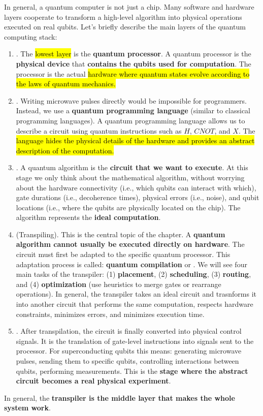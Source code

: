 \highspace
In general, a quantum computer is not just a chip. Many software and hardware layers cooperate to transform a high-level algorithm into physical operations executed on real qubits. Let's briefly describe the main layers of the quantum computing stack:
\begin{enumerate}
    \item {}. The \hl{lowest layer} is the \textbf{quantum processor}. A quantum processor is the \textbf{physical device} that \textbf{contains the qubits used for computation}. The processor is the actual \hl{hardware where quantum states evolve according to the laws of quantum mechanics.}
    \item {}. Writing microwave pulses directly would be impossible for programmers. Instead, we use a \textbf{quantum programming language} (similar to classical programming languages). A quantum programming language allows us to describe a circuit using quantum instructions such as $H$, $CNOT$, and $X$. The \hl{language hides the physical details of the hardware and provides an abstract description of the computation.}
    \item {}. A quantum algorithm is the \textbf{circuit that we want to execute}. At this stage we only think about the mathematical algorithm, without worrying about the hardware connectivity (i.e., which qubits can interact with which), gate durations (i.e., decoherence times), physical errors (i.e., noise), and qubit locations (i.e., where the qubits are physically located on the chip). The algorithm represents the \textbf{ideal computation}.
    \item {} (Transpiling). This is the central topic of the chapter. A \textbf{quantum algorithm cannot usually be executed directly on hardware}. The circuit must first be adapted to the specific quantum processor. This adaptation process is called: \textbf{quantum compilation} or . We will see four main tasks of the transpiler: (1) \textbf{placement}, (2) \textbf{scheduling}, (3) \textbf{routing}, and (4) \textbf{optimization} (use heuristics to merge gates or rearrange operations). In general, the transpiler takes an ideal circuit and trasnforms it into another circuit that performs the same computation, respects hardware constraints, minimizes errors, and minimizes execution time.
    \item {}. After transpilation, the circuit is finally converted into physical control signals. It is the translation of gate-level instructions into signals sent to the processor. For superconducting qubits this means: generating microwave pulses, sending them to specific qubits, controlling interactions between qubits, performing measurements. This is the \textbf{stage where the abstract circuit becomes a real physical experiment}.
\end{enumerate}
In general, the \textbf{transpiler is the middle layer that makes the whole system work}.